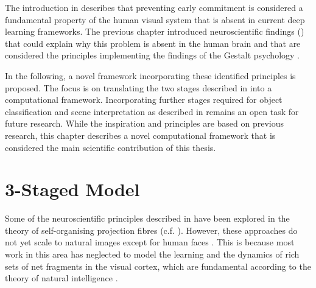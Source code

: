 The introduction in  describes that preventing early commitment \cite{marr_vision_2010} is considered a fundamental property of the human visual system that is absent in current deep learning frameworks.
The previous chapter introduced neuroscientific findings () that could explain why this problem is absent in the human brain and that are considered the principles implementing the findings of the Gestalt psychology \cite{ellis_source_1938, kohler_gestalt_1992, wagemans_century_2012, hamlyn_psychology_2017}.

In the following, a novel framework incorporating these identified principles is proposed.
The focus is on translating the two stages described in  into a computational framework.
Incorporating further stages required for object classification and scene interpretation as described in  remains an open task for future research.
While the inspiration and principles are based on previous research, this chapter describes a novel computational framework that is considered the main scientific contribution of this thesis.

\section{3-Staged Model}
Some of the neuroscientific principles described in  have been explored in the theory of self-organising projection fibres  (c.f. ). However, these approaches do not yet scale to natural images except for human faces \cite{wolfrum_recurrent_2008}. This is because most work in this area has neglected to model the learning and the dynamics of rich sets of net fragments in the visual cortex, which are fundamental according to the theory of natural intelligence .

